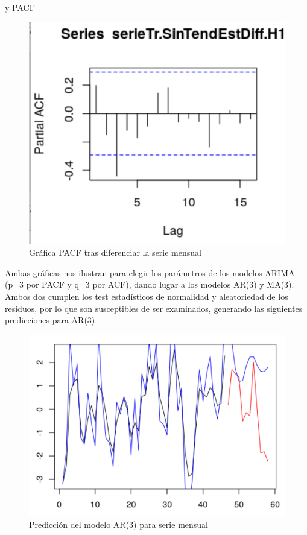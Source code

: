 y PACF

 \begin{figure}[H] %
	\centering
	\includegraphics[scale=0.31]{pacf1-mensual.png}  %
	\caption{Gráfica PACF tras diferenciar la serie mensual} 
	\label{fig:pacf-mensual}
\end{figure}


Ambas gráficas nos ilustran para elegir los parámetros de los modelos ARIMA (p=3 por PACF y q=3 por ACF), dando lugar a los modelos AR(3) y MA(3). Ambos dos cumplen los test estadísticos de normalidad y aleatoriedad de los residuos, por lo que son susceptibles de ser examinados, generando las siguientes predicciones para AR(3)

  \begin{figure}[H] %
 	\centering
 	\includegraphics[scale=0.31]{pred-ar310-mensual.png}  %
 	\caption{Predicción del modelo AR(3) para serie mensual} 
 	\label{fig:ar310}
 \end{figure}

